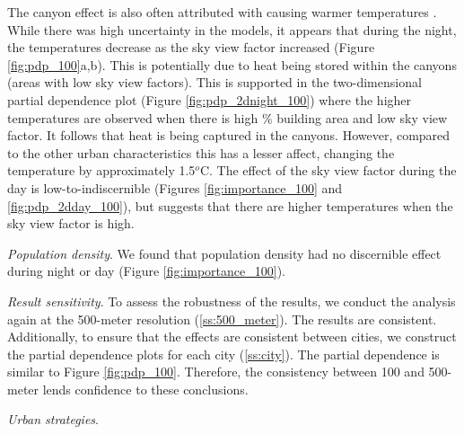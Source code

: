 \documentclass[review]{elsarticle}
\begin{document}
The canyon effect is also often attributed with causing warmer temperatures \cite{Chun2017-mm,Oke1988-re}.
While there was high uncertainty in the models, it appears that during the night, the temperatures decrease as the sky view factor increased (Figure \ref{fig:pdp_100}a,b).
This is potentially due to heat being stored within the canyons (areas with low sky view factors).
This is supported in the two-dimensional partial dependence plot (Figure \ref{fig:pdp_2dnight_100}) where the higher temperatures are observed when there is high \% building area and low sky view factor.
It follows that heat is being captured in the canyons. 
However, compared to the other urban characteristics this has a lesser affect, changing the temperature by approximately 1.5$^o$C.
The effect of the sky view factor during the day is low-to-indiscernible (Figures \ref{fig:importance_100} and \ref{fig:pdp_2dday_100}), but suggests that there are higher temperatures when the sky view factor is high.

\textit{Population density}.
We found that population density had no discernible effect during night or day (Figure \ref{fig:importance_100}).

\textit{Result sensitivity}.
To assess the robustness of the results, we conduct the analysis again at the 500-meter resolution (\ref{ss:500_meter}).
The results are consistent.
Additionally, to ensure that the effects are consistent between cities, we construct the partial dependence plots for each city (\ref{ss:city}).
The partial dependence is similar to Figure \ref{fig:pdp_100}.
Therefore, the consistency between 100 and 500-meter lends confidence to these conclusions.

\textit{Urban strategies}.
\end{document}
